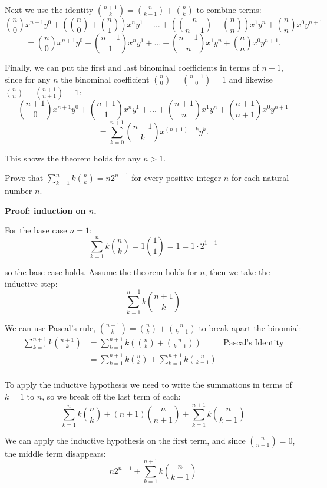 \documentclass{article}
\begin{document}
Next we use the identity $\binom{n+1}{k} = \binom{n}{k-1} + \binom{n}{k}$ to combine terms:
$$\binom{n}{0}x^{n+1}y^0 + \left(\binom{n}{0} + \binom{n}{1}\right)x^n y^1 + \ldots + \left(\binom{n}{n-1} + \binom{n}{n}\right)x^1 y^n + \binom{n}{n}x^0 y^{n+1}$$
$$=\binom{n}{0}x^{n+1}y^0 + \binom{n+1}{1}x^n y^1 + \ldots + \binom{n+1}{n}x^1 y^n + \binom{n}{n}x^0 y^{n+1}.$$

Finally, we can put the first and last binominal coefficients in terms of $n+1$, since for any $n$ the binominal coefficient $\binom{n}{0} = \binom{n+1}{0} = 1$ and likewise $\binom{n}{n} = \binom{n+1}{n+1} = 1$:
$$\binom{n+1}{0}x^{n+1}y^0 + \binom{n+1}{1}x^n y^1 + \ldots + \binom{n+1}{n}x^1 y^n + \binom{n+1}{n+1}x^0 y^{n+1}$$
$$ = \sum_{k=0}^{n+1} \binom{n+1}{k}x^{(n+1)-k}y^k.$$

This shows the theorem holds for any $n > 1$.

\begin{problem}
Prove that $\sum_{k=1}^n k \binom{n}{k} = n2^{n-1}$ for every positive integer $n$ for each natural number $n$.
\end{problem}

\textbf{Proof: induction on $n$.}

For the base case $n = 1$:
$$\sum_{k=1}^n k \binom{n}{k} = 1\binom{1}{1} = 1 = 1\cdot 2^{1-1}$$

so the base case holds. Assume the theorem holds for $n$, then we take the inductive step:
$$\sum_{k=1}^{n+1} k \binom{n+1}{k}$$

We can use Pascal's rule, $\binom{n + 1}{k} = \binom{n}{k} + \binom{n}{k-1}$ to break apart the binomial:
\begin{align*}
  \sum_{k=1}^{n+1} k \binom{n+1}{k} & = \sum_{k=1}^{n+1}k\left(\binom{n}{k} + \binom{n}{k-1}             \right) & \text{Pascal's Identity} \\
                                    & = \sum_{k=1}^{n+1}k\binom{n}{k} + \sum_{k=1}^{n+1} k \binom{n}{k-1}        &                          \\
\end{align*}

To apply the inductive hypothesis we need to write the summations in terms of $k = 1$ to $n$, so we break off the last term of each:
$$\sum_{k=1}^n k \binom{n}{k} + (n+1)\binom{n}{n+1} + \sum_{k=1}^{n+1} k \binom{n}{k-1}$$

We can apply the inductive hypothesis on the first term, and since $\binom{n}{n+1} = 0$, the middle term disappears:
$$n2^{n-1} +\sum_{k=1}^{n+1} k \binom{n}{k-1}$$
\end{document}
